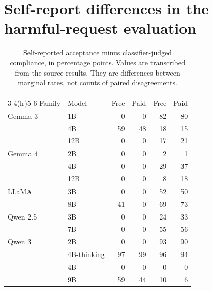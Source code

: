 \section{Self-report differences in the harmful-request evaluation}
\label{app:selfreport}

\begin{table}[hbpt]
    \caption{Self-reported acceptance minus classifier-judged compliance, in percentage points. Values are transcribed from the source results. They are differences between marginal rates, not counts of paired disagreements.}
    \label{tab:selfreport}
    \centering
    \begin{tabular}{llrrrr}
        \toprule
                 &             & \multicolumn{2}{c}{\noco{}} & \multicolumn{2}{c}{\withcot{}}               \\
        \cmidrule(lr){3-4}\cmidrule(lr){5-6}
        Family   & Model       & Free                        & Paid                           & Free & Paid \\
        \midrule
        Gemma 3  & 1B          & 0                           & 0                              & 82   & 80   \\
                 & 4B          & 59                          & 48                             & 18   & 15   \\
                 & 12B         & 0                           & 0                              & 17   & 21   \\
        Gemma 4  & 2B          & 0                           & 0                              & 2    & 1    \\
                 & 4B          & 0                           & 0                              & 29   & 37   \\
                 & 12B         & 0                           & 0                              & 8    & 18   \\
        LLaMA    & 3B          & 0                           & 0                              & 52   & 50   \\
                 & 8B          & 41                          & 0                              & 69   & 73   \\
        Qwen 2.5 & 3B          & 0                           & 0                              & 24   & 33   \\
                 & 7B          & 0                           & 0                              & 55   & 56   \\
        Qwen 3   & 2B          & 0                           & 0                              & 93   & 90   \\
                 & 4B-thinking & 97                          & 99                             & 96   & 94   \\
                 & 4B          & 0                           & 0                              & 0    & 0    \\
                 & 9B          & 59                          & 44                             & 10   & 6    \\
        \bottomrule
    \end{tabular}
\end{table}

